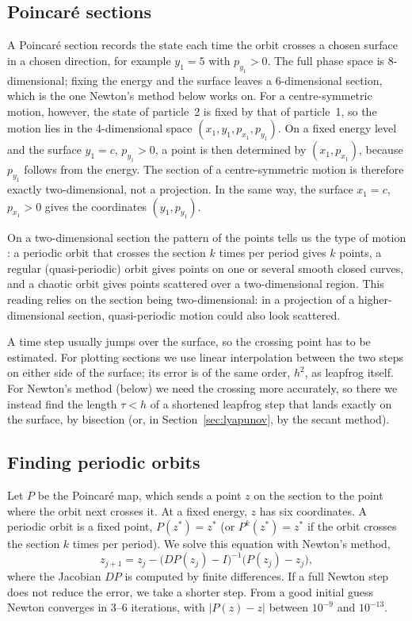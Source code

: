 \documentclass[11pt,a4paper]{article}
\begin{document}
\subsection{Poincar\'e sections}
A Poincar\'e section records the state each time the orbit crosses a chosen
surface in a chosen direction, for example $y_1=5$ with $p_{y_1}>0$. The full
phase space is 8-dimensional; fixing the energy and the surface leaves a
6-dimensional section, which is the one Newton's method below works on. For a
centre-symmetric motion, however, the state of particle~2 is fixed by that of
particle~1, so the motion lies in the 4-dimensional space
$(x_1,y_1,p_{x_1},p_{y_1})$. On a fixed energy level and the surface $y_1=c$,
$p_{y_1}>0$, a point is then determined by $(x_1,p_{x_1})$, because $p_{y_1}$
follows from the energy. The section of a centre-symmetric motion is therefore
exactly two-dimensional, not a projection. In the same way, the surface
$x_1=c$, $p_{x_1}>0$ gives the coordinates $(y_1,p_{y_1})$.

On a two-dimensional section the pattern of the points tells us the type of
motion \cite{lichtenberg1992}: a periodic orbit that crosses the section $k$
times per period gives $k$ points, a regular (quasi-periodic) orbit gives
points on one or several smooth closed curves, and a chaotic orbit gives points
scattered over a two-dimensional region. This reading relies on the section
being two-dimensional: in a projection of a higher-dimensional section,
quasi-periodic motion could also look scattered.

A time step usually jumps over the surface, so the crossing point has to be
estimated. For plotting sections we use linear interpolation between the two
steps on either side of the surface; its error is of the same order, $h^2$, as
leapfrog itself. For Newton's method (below) we need the crossing more
accurately, so there we instead find the length $\tau<h$ of a shortened
leapfrog step that lands exactly on the surface, by bisection (or, in
Section~\ref{sec:lyapunov}, by the secant method).

\subsection{Finding periodic orbits}\label{sec:newton}
Let $P$ be the Poincar\'e map, which sends a point $z$ on the section to the
point where the orbit next crosses it. At a fixed energy, $z$ has six
coordinates. A periodic orbit is a fixed point, $P(z^*)=z^*$ (or
$P^k(z^*)=z^*$ if the orbit crosses the section $k$ times per period). We solve
this equation with Newton's method,
\begin{equation}\label{eq:newton}
  z_{j+1}=z_j-\bigl(DP(z_j)-I\bigr)^{-1}\bigl(P(z_j)-z_j\bigr),
\end{equation}
where the Jacobian $DP$ is computed by finite differences. If a full Newton
step does not reduce the error, we take a shorter step. From a good initial
guess Newton converges in 3--6 iterations, with $|P(z)-z|$ between $10^{-9}$
and $10^{-13}$.
\end{document}
